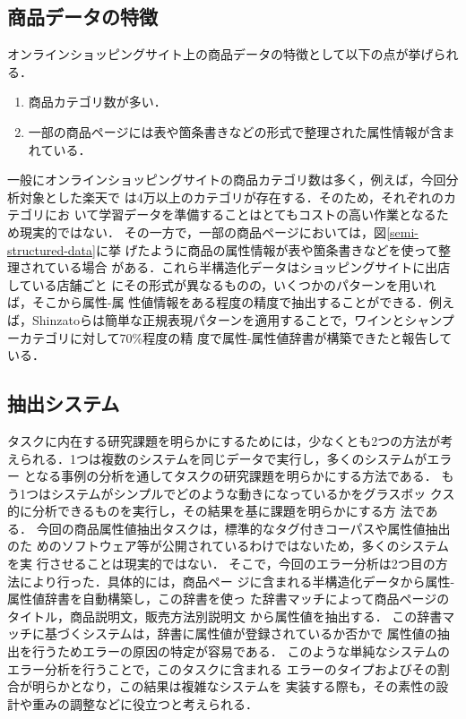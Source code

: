 \documentclass[japanese]{jnlp_1.4}
\begin{document}
\subsection{商品データの特徴}

オンラインショッピングサイト上の商品データの特徴として以下の点が挙げられる．

\begin{enumerate}
\item 商品カテゴリ数が多い．
\item 一部の商品ページには表や箇条書きなどの形式で整理された属性情報が含まれている．
\end{enumerate}

\noindent
一般にオンラインショッピングサイトの商品カテゴリ数は多く，例えば，今回分析対象とした楽天で
は4万以上のカテゴリが存在する．そのため，それぞれのカテゴリにお
いて学習データを準備することはとてもコストの高い作業となるため現実的ではない．
その一方で，一部の商品ページにおいては，図\ref{semi-structured-data}に挙
げたように商品の属性情報が表や箇条書きなどを使って整理されている場合
がある．これら半構造化データはショッピングサイトに出店している店舗ごと
にその形式が異なるものの，いくつかのパターンを用いれば，そこから属性-属
性値情報をある程度の精度で抽出することができる．例えば，Shinzatoら\cite{shinzato2013}は簡単な正規表現パターンを適用することで，ワインとシャンプーカテゴリに対して70\%程度の精
度で属性-属性値辞書が構築できたと報告している．


\subsection{抽出システム}

タスクに内在する研究課題を明らかにするためには，少なくとも2つの方法が考
えられる．1つは複数のシステムを同じデータで実行し，多くのシステムがエラー
となる事例の分析を通してタスクの研究課題を明らかにする方法である．
もう1つはシステムがシンプルでどのような動きになっているかをグラスボッ
クス的に分析できるものを実行し，その結果を基に課題を明らかにする方
法である．
今回の商品属性値抽出タスクは，標準的なタグ付きコーパスや属性値抽出のた
めのソフトウェア等が公開されているわけではないため，多くのシステムを実
行させることは現実的ではない．
そこで，今回のエラー分析は2つ目の方法により行った．具体的には，商品ペー
ジに含まれる半構造化データから属性-属性値辞書を自動構築し，この辞書を使っ
た辞書マッチによって商品ページのタイトル，商品説明文，販売方法別説明文
から属性値を抽出する．
この辞書マッチに基づくシステムは，辞書に属性値が登録されているか否かで
属性値の抽出を行うためエラーの原因の特定が容易である．
このような単純なシステムのエラー分析を行うことで，このタスクに含まれる
エラーのタイプおよびその割合が明らかとなり，この結果は複雑なシステムを
実装する際も，その素性の設計や重みの調整などに役立つと考えられる．
\end{document}
